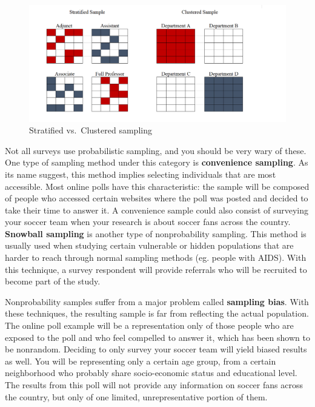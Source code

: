 \documentclass{book}
\begin{document}
\begin{figure}
\hypertarget{fig:samples}{%
\centering
\includegraphics{images/data/samples.png}
\caption{Stratified vs.~Clustered sampling}\label{fig:samples}
}
\end{figure}

Not all surveys use probabilistic sampling, and you should be very wary of
these. One type of sampling method under this category is \textbf{convenience
sampling}. As its name suggest, this method implies selecting individuals that
are most accessible. Most online polls have this characteristic: the sample
will be composed of people who accessed certain websites where the poll was
posted and decided to take their time to answer it. A convenience sample could
also consist of surveying your soccer team when your research is about soccer
fans across the country. \textbf{Snowball sampling} is another type of
nonprobability sampling. This method is usually used when studying certain
vulnerable or hidden populations that are harder to reach through normal
sampling methods (eg. people with AIDS). With this technique, a survey
respondent will provide referrals who will be recruited to become part of the
study.

Nonprobability samples suffer from a major problem called \textbf{sampling
bias}. With these techniques, the resulting sample is far from reflecting the
actual population. The online poll example will be a representation only of
those people who are exposed to the poll and who feel compelled to answer it,
which has been shown to be nonrandom. Deciding to only survey your soccer team
will yield biased results as well. You will be representing only a certain age
group, from a certain neighborhood who probably share socio-economic status
and educational level. The results from this poll will not provide any
information on soccer fans across the country, but only of one limited,
unrepresentative portion of them.
\end{document}
